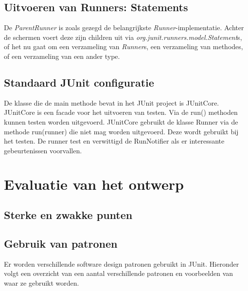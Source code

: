 \documentclass[i1]{oss}
\begin{document}
\subsection{Uitvoeren van Runners: Statements}

De \emph{ParentRunner} is zoals gezegd de belangrijkste \emph{Runner}-implementatie. Achter de schermen voert deze zijn children uit via \emph{org.junit.runners.model.Statement}s, of het nu gaat om een verzameling van \emph{Runner}s, een verzameling van methodes, of een verzameling van een ander type.

\subsection{}

\subsection{Standaard JUnit configuratie}

De klasse die de main methode bevat in het JUnit project is JUnitCore. JUnitCore is een facade voor het uitvoeren van testen. Via de run() methoden kunnen testen worden uitgevoerd. JUnitCore gebruikt de klasse Runner via de methode run(runner) die niet mag worden uitgevoerd. Deze wordt gebruikt bij het testen. De runner test en verwittigd de RunNotifier als er interessante gebeurtenissen voorvallen. 





\section{Evaluatie van het ontwerp}


\subsection{Sterke en zwakke punten}

\subsection{Gebruik van patronen}

Er worden verschillende software design patronen gebruikt in JUnit. 
Hieronder volgt een overzicht van een aantal verschillende patronen en voorbeelden van waar ze gebruikt worden.
\end{document}
